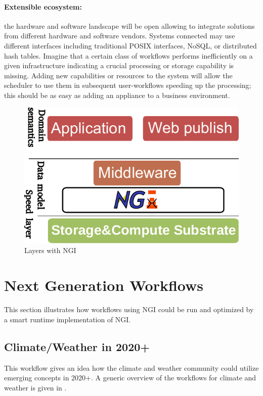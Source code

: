 \documentclass[a4paper, twocolumn]{article}
\begin{document}
\paragraph{Extensible ecosystem:}
the hardware and software landscape will be open allowing to integrate solutions from different hardware and software vendors.
Systems connected may use different interfaces including traditional POSIX interfaces, NoSQL, or distributed hash tables.
Imagine that a certain class of workflows performs inefficiently on a given infrastructure indicating a crucial processing or storage capability is missing.
Adding new capabilities or resources to the system will allow the scheduler to use them in subsequent user-workflows speeding up the processing; this should be as easy as adding an appliance to a business environment.



\begin{figure}[b]
  \centering
  \includegraphics[width=0.75\columnwidth]{layers-ngi}
  \caption{Layers with NGI}
  \label{fig:ngilayers}
\end{figure}


\section{Next Generation Workflows}

This section illustrates how workflows using NGI could be run and optimized by a smart runtime implementation of NGI.


\subsection{Climate/Weather in 2020+}

This workflow gives an idea how the climate and weather community could utilize emerging concepts in 2020+.
A generic overview of the workflows for climate and weather is given in .
\end{document}
